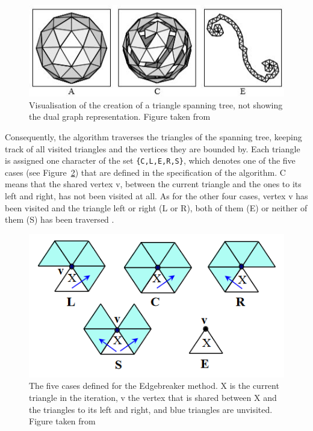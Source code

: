 \begin{figure}[h]
    \centering
    \includegraphics[scale=0.8]{figs/related_work/spanningtree.jpg}
    \caption{Visualisation of the creation of a triangle spanning tree, not showing the dual graph representation. Figure taken from \citet{taubin1998geometry}}
    \label{fig:spanningtree}
\end{figure}

Consequently, the algorithm traverses the triangles of the spanning tree, keeping track of all visited triangles and the vertices they are bounded by.
Each triangle is assigned one character of the set \texttt{\{C,L,E,R,S\}}, which denotes one of the five cases (see Figure~\ref{fig:clers}) that are defined in the specification of the algorithm.
C means that the shared vertex v, between the current triangle and the ones to its left and right, has not been visited at all.
As for the other four cases, vertex v has been visited and the triangle left or right (L or R), both of them (E) or neither of them (S) has been traversed \citep{rossignac2003edgebreaker, rossignac20013d}.


\begin{figure}[h!]
    \centering
    \includegraphics[scale=0.8]{figs/related_work/clers.png}
    \caption{The five cases defined for the Edgebreaker method. X is the current triangle in the iteration, v the vertex that is shared between X and the triangles to its left and right, and blue triangles are unvisited. Figure taken from \citet{rossignac2003edgebreaker}}
    \label{fig:clers}
\end{figure}

